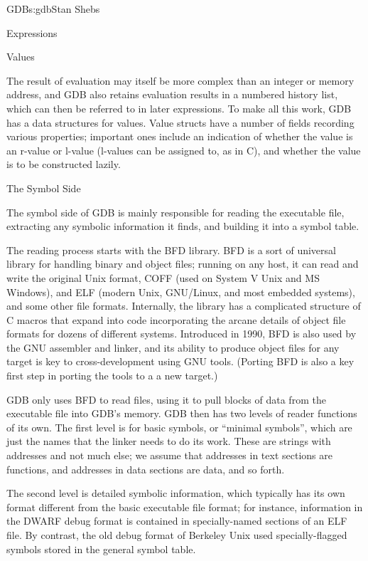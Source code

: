 \begin{aosachapter}{GDB}{s:gdb}{Stan Shebs}
\begin{aosasect2}{Expressions}
\end{aosasect2}

\begin{aosasect2}{Values}

The result of evaluation may itself be more complex than an integer or
memory address, and GDB also retains evaluation results in a numbered
history list, which can then be referred to in later expressions.  To
make all this work, GDB has a data structures for values.  Value
structs have a number of fields recording various properties;
important ones include an indication of whether the value is an
r-value or l-value (l-values can be assigned to, as in C), and whether
the value is to be constructed lazily.

\end{aosasect2}

\begin{aosasect1}{The Symbol Side}

The symbol side of GDB is mainly responsible for reading the
executable file, extracting any symbolic information it finds, and
building it into a symbol table.

The reading process starts with the BFD library.  BFD is a sort of
universal library for handling binary and object files; running on any
host, it can read and write the original Unix  format,
COFF (used on System V Unix and MS Windows), and ELF (modern Unix,
GNU/Linux, and most embedded systems), and some other file formats.
Internally, the library has a complicated structure of C macros that
expand into code incorporating the arcane details of object file
formats for dozens of different systems.  Introduced in 1990, BFD is
also used by the GNU assembler and linker, and its ability to produce
object files for any target is key to cross-development using GNU
tools.  (Porting BFD is also a key first step in porting the tools to a
a new target.)

GDB only uses BFD to read files, using it to pull blocks of data
from the executable file into GDB's memory. GDB then has two levels of
reader functions of its own. The first level is for basic symbols, or
``minimal symbols'', which are just the names that the linker needs to
do its work. These are strings with addresses and not much else; we
assume that addresses in text sections are functions, and addresses
in data sections are data, and so forth.

The second level is detailed symbolic information, which typically has
its own format different from the basic executable file format; for
instance, information in the DWARF debug format is contained in
specially-named sections of an ELF file.  By contrast, the old
 debug format of Berkeley Unix used specially-flagged
symbols stored in the general symbol table.


\end{aosasect1}
\end{aosachapter}

